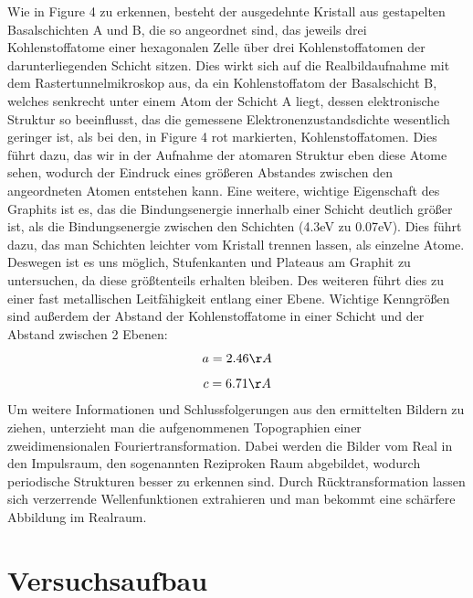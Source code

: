 \documentclass[10pt,a4paper]{article}
\begin{document}
Wie in Figure 4 zu erkennen, besteht der ausgedehnte Kristall aus gestapelten Basalschichten A und B, die so angeordnet sind, das jeweils drei Kohlenstoffatome einer hexagonalen Zelle über drei Kohlenstoffatomen der darunterliegenden Schicht sitzen. Dies wirkt sich auf die Realbildaufnahme mit dem Rastertunnelmikroskop aus, da ein Kohlenstoffatom der Basalschicht B, welches senkrecht unter einem Atom der Schicht A liegt, dessen elektronische Struktur so beeinflusst, das die gemessene Elektronenzustandsdichte wesentlich geringer ist, als bei den, in Figure 4 rot markierten, Kohlenstoffatomen. Dies führt dazu, das wir in der Aufnahme der atomaren Struktur eben diese Atome sehen, wodurch der Eindruck eines größeren Abstandes zwischen den angeordneten Atomen entstehen kann. Eine weitere, wichtige Eigenschaft des Graphits ist es, das die Bindungsenergie innerhalb einer Schicht deutlich größer ist, als die Bindungsenergie zwischen den Schichten (4.3eV zu 0.07eV). Dies führt dazu, das man Schichten leichter vom Kristall trennen lassen, als einzelne Atome. Deswegen ist es uns möglich, Stufenkanten und Plateaus am Graphit zu untersuchen, da diese größtenteils erhalten bleiben. Des weiteren führt dies zu einer fast metallischen Leitfähigkeit entlang einer Ebene. Wichtige Kenngrößen sind außerdem der Abstand der Kohlenstoffatome in einer Schicht und der Abstand zwischen 2 Ebenen:
$$a = 2.46 \AA$$
$$c = 6.71 \AA$$
Um weitere Informationen und Schlussfolgerungen aus den ermittelten Bildern zu ziehen, unterzieht man die aufgenommenen Topographien einer zweidimensionalen Fouriertransformation. Dabei werden die Bilder vom Real in den Impulsraum, den sogenannten Reziproken Raum abgebildet, wodurch periodische Strukturen besser zu erkennen sind. Durch Rücktransformation lassen sich verzerrende Wellenfunktionen extrahieren und man bekommt eine schärfere Abbildung im Realraum.
  

\section{	Versuchsaufbau}
\end{document}
